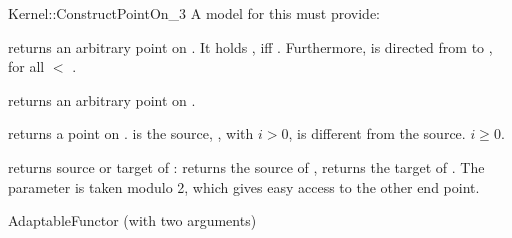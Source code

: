 \begin{ccRefFunctionObjectConcept}{Kernel::ConstructPointOn_3}
A model for this must provide:


       {returns an arbitrary point on . It holds 
        , iff .
        Furthermore,  is directed from 
        to , for all  $<$ .}

       {returns an arbitrary point on .}

       {returns a point on .  is the source,
        , with $i>0$, is different from the 
        source. \ccPrecond $i \geq 0$.}

       {returns source or target   of :    returns
        the source of ,  returns the target of .
        The parameter  is taken modulo 2, which gives 
        easy access to the other end point. }

\ccRefines
AdaptableFunctor (with two arguments)

\ccSeeAlso
{} \\
 \\
 \\
 \\

\end{ccRefFunctionObjectConcept}

